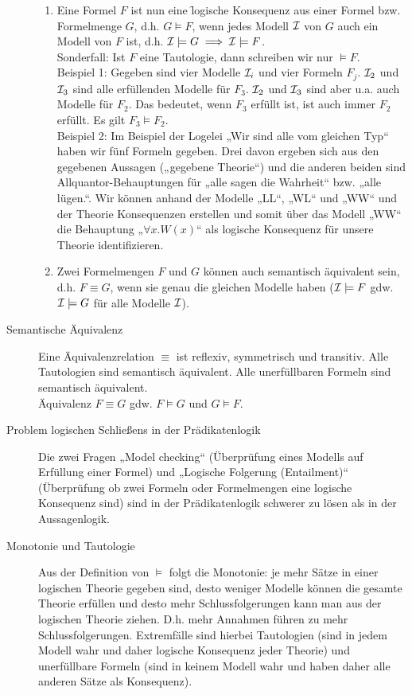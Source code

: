 \begin{description}
\begin{enumerate}
                \item Eine Formel $F$ ist nun eine \f{logische Konsequenz} aus einer Formel bzw. Formelmenge $G$, d.h. $G \models F$, wenn jedes Modell $\mathcal{I}$ von $G$ auch ein Modell von $F$ ist, d.h. $\mathcal{I} \models G \implies \mathcal{I} \models F$. \\
                Sonderfall: Ist $F$ eine Tautologie, dann schreiben wir nur $\models F$. \\

                Beispiel 1: Gegeben sind vier Modelle $\mathcal{I}_{i}$ und vier Formeln $F_{j}$. $\mathcal{I}_{2}$ und $\mathcal{I}_{3}$ sind alle erfüllenden Modelle für $F_{3}$. $\mathcal{I}_{2}$ und $\mathcal{I}_{3}$ sind aber u.a. auch Modelle für $F_{2}$. Das bedeutet, wenn $F_{3}$ erfüllt ist, ist auch immer $F_{2}$ erfüllt. Es gilt $F_{3} \models F_{2}$. \\

                Beispiel 2: Im Beispiel der Logelei „Wir sind alle vom gleichen Typ“ haben wir fünf Formeln gegeben. Drei davon ergeben sich aus den gegebenen Aussagen („gegebene Theorie“) und die anderen beiden sind Allquantor-Behauptungen für „alle sagen die Wahrheit“ bzw. „alle lügen.“. Wir können anhand der Modelle „LL“, „WL“ und „WW“ und der Theorie Konsequenzen erstellen und somit über das Modell „WW“ die Behauptung „$\forall x.W(x)$“ als logische Konsequenz für unsere Theorie identifizieren.

                \item Zwei Formelmengen $F$ und $G$ können auch semantisch äquivalent sein, d.h. $F \equiv G$, wenn sie genau die gleichen Modelle haben ($\mathcal{I} \models F$ gdw. $\mathcal{I} \models G$ für alle Modelle $\mathcal{I}$).
            \end{enumerate}
        \item[Semantische Äquivalenz] Eine Äquivalenzrelation $\equiv$ ist reflexiv, symmetrisch und transitiv. Alle Tautologien sind semantisch äquivalent. Alle unerfüllbaren Formeln sind semantisch äquivalent. \\ Äquivalenz $F \equiv G$ gdw. $F\models G$ und $G \models F$.
        \item[Problem logischen Schließens in der Prädikatenlogik] Die zwei Fragen „Model checking“ (Überprüfung eines Modells auf Erfüllung einer Formel) und „Logische Folgerung (Entailment)“ (Überprüfung ob zwei Formeln oder Formelmengen eine logische Konsequenz sind) sind in der Prädikatenlogik schwerer zu lösen als in der Aussagenlogik.
        \item[Monotonie und Tautologie] Aus der Definition von $\models$ folgt die Monotonie: je mehr Sätze in einer logischen Theorie gegeben sind, desto weniger Modelle können die gesamte Theorie erfüllen und desto mehr Schlussfolgerungen kann man aus der logischen Theorie ziehen. D.h. mehr Annahmen führen zu mehr Schlussfolgerungen. Extremfälle sind hierbei Tautologien (sind in jedem Modell wahr und daher logische Konsequenz jeder Theorie) und unerfüllbare Formeln (sind in keinem Modell wahr und haben daher alle anderen Sätze als Konsequenz).


\end{description}
